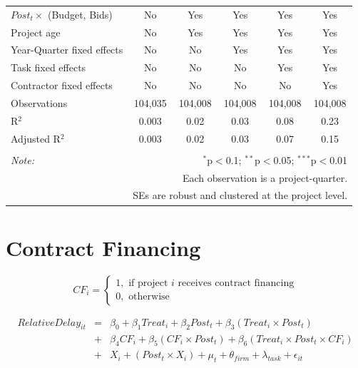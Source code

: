 \documentclass[]{article}
\begin{document}
\begin{table}[H]
\begin{tabular}{@{\extracolsep{-2pt}}lccccc}
$Post_t \times$  (Budget, Bids) & No & Yes & Yes & Yes & Yes \\ 
Project age & No & Yes & Yes & Yes & Yes \\ 
Year-Quarter fixed effects & No & No & Yes & Yes & Yes \\ 
Task fixed effects & No & No & No & Yes & Yes \\ 
Contractor fixed effects & No & No & No & No & Yes \\ 
Observations & 104,035 & 104,008 & 104,008 & 104,008 & 104,008 \\ 
R$^{2}$ & 0.003 & 0.02 & 0.03 & 0.08 & 0.23 \\ 
Adjusted R$^{2}$ & 0.003 & 0.02 & 0.03 & 0.07 & 0.15 \\ 
\hline 
\hline \\[-1.8ex] 
\textit{Note:}  & \multicolumn{5}{r}{$^{*}$p$<$0.1; $^{**}$p$<$0.05; $^{***}$p$<$0.01} \\ 
 & \multicolumn{5}{r}{Each observation is a project-quarter.} \\ 
 & \multicolumn{5}{r}{SEs are robust and clustered at the project level.} \\ 
\end{tabular} 
\end{table}

\hypertarget{contract-financing}{%
\section{Contract Financing}\label{contract-financing}}

\[ CF_i = \begin{cases} 1, \text{ if project } i \text{ receives contract financing}\\
0, \text{ otherwise} \end{cases}\]

\[ \begin{aligned}
RelativeDelay_{it} &=& \beta_0+\beta_1 Treat_i + \beta_2 Post_t + \beta_3 (Treat_i \times Post_t) \\
&+&\beta_4 CF_i + \beta_5 (CF_i \times Post_t) + \beta_6 (Treat_i \times Post_t \times CF_i) \\ 
&+&X_i + (Post_t \times X_i) + \mu_t + \theta_{firm} + \lambda_{task}+ \epsilon_{it}
\end{aligned}\]
\end{document}
